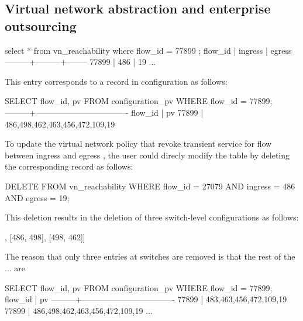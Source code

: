 % 




\subsection{Virtual network abstraction and enterprise outsourcing}

\begin{sql}
select * from vn_reachability where flow_id = 77899 ;
 flow_id | ingress | egress 
---------+---------+--------
   77899 |     486 |     19  
   ...
\end{sql}

This entry corresponds to a record in configuration as follows:
\begin{sql}
SELECT flow_id, pv FROM configuration_pv WHERE flow_id = 77899;
---------+----------------------------------
 flow_id |                pv                
   77899 | {486,498,462,463,456,472,109,19}
\end{sql}

To update the virtual network policy that revoke transient service for
flow  between ingress  and egress , the user
could direcly modify the  table by deleting the
corresponding record as follows:
\begin{sql}
DELETE FROM vn_reachability WHERE 
        flow_id = 27079 AND ingress = 486 AND egress = 19;  
\end{sql}

This deletion results in the deletion of three switch-level
configurations as follows:
\begin{sql}
[[462, 463], [486, 498], [498, 462]]  
\end{sql}
The reason that only three entries at switches  are
removed is that the rest of the ... are 

\begin{sql}
SELECT flow_id, pv FROM configuration_pv WHERE flow_id = 77899;
 flow_id |                pv                
---------+----------------------------------
   77899 | {483,463,456,472,109,19}
   77899 | {486,498,462,463,456,472,109,19}
   ...
\end{sql}

